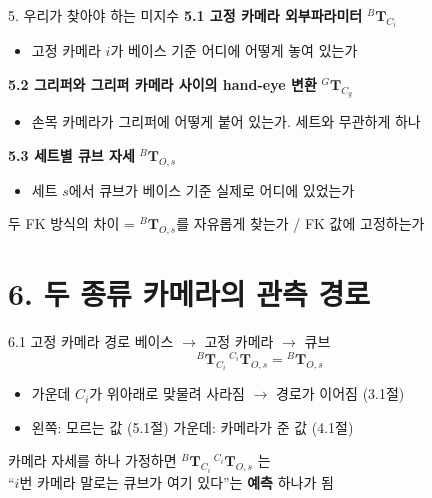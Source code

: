 \documentclass[aspectratio=169,11pt]{beamer}
\newif\ifcorrectedfk
\newcommand{\T}[3][]{{}^{#2}\mathbf{T}^{#1}_{#3}}   %
\begin{document}
\begin{frame}{5. 우리가 찾아야 하는 미지수}
  \textbf{5.1 고정 카메라 외부파라미터} \hfill $\T{B}{C_i}$
  \vspace{-1mm}
  \begin{itemize}
    \item 고정 카메라 $i$가 베이스 기준 어디에 어떻게 놓여 있는가
  \end{itemize}
  \vfill
  \textbf{5.2 그리퍼와 그리퍼 카메라 사이의 hand-eye 변환} \hfill $\T{G}{C_g}$
  \vspace{-1mm}
  \begin{itemize}
    \item 손목 카메라가 그리퍼에 어떻게 붙어 있는가. 세트와 무관하게 하나
  \end{itemize}
  \vfill
  \textbf{5.3 세트별 큐브 자세} \hfill $\T{B}{O,s}$
  \vspace{-1mm}
  \begin{itemize}
    \item 세트 $s$에서 큐브가 베이스 기준 실제로 어디에 있었는가
  \end{itemize}
  \vfill
  \begin{alertblock}{}
    \ifcorrectedfk
      세 FK 방식의 차이 = $\T{B}{O,s}$를 자유롭게 찾는가 / FK 값에 고정하는가 /
      보정된 anchor에 고정하는가
    \else
      두 FK 방식의 차이 = $\T{B}{O,s}$를 자유롭게 찾는가 / FK 값에 고정하는가
    \fi
  \end{alertblock}
\end{frame}

\section{6. 두 종류 카메라의 관측 경로}

\begin{frame}{6.1 고정 카메라 경로}
  베이스 $\rightarrow$ 고정 카메라 $\rightarrow$ 큐브
  \[
    \T{B}{C_i}\,
    \T{C_i}{O,s}
    =
    \T{B}{O,s}
  \]
  \begin{itemize}
    \item 가운데 $C_i$가 위아래로 맞물려 사라짐 $\rightarrow$ 경로가 이어짐 (3.1절)
    \item 왼쪽: 모르는 값 (5.1절) \quad 가운데: 카메라가 준 값 (4.1절)
  \end{itemize}
  \vfill
  \begin{block}{}
    \centering
    카메라 자세를 하나 가정하면 $\T{B}{C_i}\,\T{C_i}{O,s}$ 는\\
    ``$i$번 카메라 말로는 큐브가 여기 있다''는 \textbf{예측} 하나가 됨
  \end{block}
\end{frame}
\end{document}
